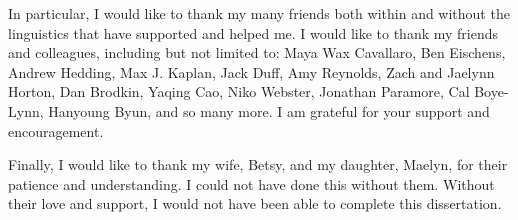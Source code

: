 \begin{acknowledgements}
    In particular, I would like to thank my many friends both within and without the linguistics that have supported and helped me. I would like to thank my friends and colleagues, including but not limited to: Maya Wax Cavallaro, Ben Eischens, Andrew Hedding, Max J. Kaplan, Jack Duff, Amy Reynolds, Zach and Jaelynn Horton, Dan Brodkin, Yaqing Cao, Niko Webster, Jonathan Paramore, Cal Boye-Lynn, Hanyoung Byun, and so many more. I am grateful for your support and encouragement. 

    Finally, I would like to thank my wife, Betsy, and my daughter, Maelyn, for their patience and understanding. I could not have done this without them. Without their love and support, I would not have been able to complete this dissertation.
\end{acknowledgements}

